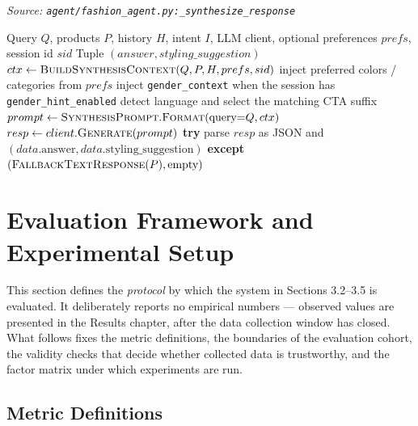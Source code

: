 \begin{algorithm}[H]
\caption{Synthesize the Final Response (Step 5)}\label{alg:synthesize_response}
\textit{Source: \texttt{agent/fashion\_agent.py:\_synthesize\_response}}
\begin{algorithmic}[1]
\Require Query $Q$, products $P$, history $H$, intent $I$, LLM client, optional preferences $prefs$, session id $sid$
\Ensure Tuple $(answer, styling\_suggestion)$
    \State $ctx \gets \textsc{BuildSynthesisContext}(Q, P, H, prefs, sid)$
    \Statex \quad inject preferred colors / categories from $prefs$
    \Statex \quad inject \texttt{gender\_context} when the session has \texttt{gender\_hint\_enabled}
    \Statex \quad detect language and select the matching CTA suffix
    \State $prompt \gets \textsc{SynthesisPrompt}.\textsc{Format}(\text{query}{=}Q, ctx)$
    \State $resp \gets client.\textsc{Generate}(prompt)$
    \State \textbf{try} parse $resp$ as JSON and \Return $(data.\text{answer}, data.\text{styling\_suggestion})$
    \State \textbf{except} \Return $(\textsc{FallbackTextResponse}(P), \text{empty})$
\EndFunction
\end{algorithmic}
\end{algorithm}

\section{Evaluation Framework and Experimental Setup}

This section defines the \emph{protocol} by which the system in Sections 3.2--3.5 is evaluated. It deliberately reports no empirical numbers --- observed values are presented in the Results chapter, after the data collection window has closed. What follows fixes the metric definitions, the boundaries of the evaluation cohort, the validity checks that decide whether collected data is trustworthy, and the factor matrix under which experiments are run.

\subsection{Metric Definitions}

